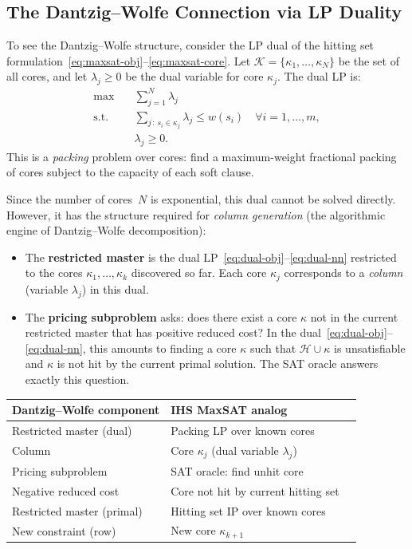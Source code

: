 \documentclass[11pt,a4paper]{article}
\begin{document}
\subsection{The Dantzig--Wolfe Connection via LP Duality}

To see the Dantzig--Wolfe structure, consider the LP dual of the hitting set
formulation~\eqref{eq:maxsat-obj}--\eqref{eq:maxsat-core}. Let $\mathcal{K} =
\{\kappa_1, \ldots, \kappa_N\}$ be the set of all cores, and let $\lambda_j
\geq 0$ be the dual variable for core $\kappa_j$. The dual LP is:
\begin{align}
\max \quad & \sum_{j=1}^{N} \lambda_j \label{eq:dual-obj}\\
\text{s.t.} \quad & \sum_{j \,:\, s_i \in \kappa_j} \lambda_j \leq w(s_i) \quad \forall i = 1,\ldots,m, \label{eq:dual-pack}\\
& \lambda_j \geq 0. \label{eq:dual-nn}
\end{align}
This is a \emph{packing} problem over cores: find a maximum-weight fractional
packing of cores subject to the capacity of each soft clause.

Since the number of cores~$N$ is exponential, this dual cannot be solved
directly. However, it has the structure required for \emph{column generation}
(the algorithmic engine of Dantzig--Wolfe decomposition):
\begin{itemize}
\item The \textbf{restricted master} is the dual LP~\eqref{eq:dual-obj}--\eqref{eq:dual-nn} restricted to the cores $\kappa_1, \ldots, \kappa_k$ discovered so far. Each core $\kappa_j$ corresponds to a \emph{column} (variable $\lambda_j$) in this dual.
\item The \textbf{pricing subproblem} asks: does there exist a core $\kappa$ not in the current restricted master that has positive reduced cost? In the dual~\eqref{eq:dual-obj}--\eqref{eq:dual-nn}, this amounts to finding a core $\kappa$ such that $\mathcal{H} \cup \kappa$ is unsatisfiable and $\kappa$ is not hit by the current primal solution. The SAT oracle answers exactly this question.
\end{itemize}

\begin{center}
\begin{tabular}{lll}
\toprule
\textbf{Dantzig--Wolfe component} & \textbf{IHS MaxSAT analog} \\
\midrule
Restricted master (dual) & Packing LP over known cores \\
Column & Core $\kappa_j$ (dual variable $\lambda_j$) \\
Pricing subproblem & SAT oracle: find unhit core \\
Negative reduced cost & Core not hit by current hitting set \\
\midrule
Restricted master (primal) & Hitting set IP over known cores \\
New constraint (row) & New core $\kappa_{k+1}$ \\
\bottomrule
\end{tabular}
\end{center}
\end{document}
